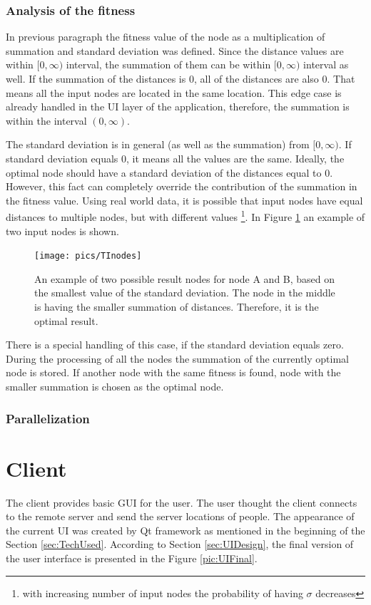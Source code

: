 \documentclass[thesis=M,english]{FITthesis}[2012/10/20]
\begin{document}
\subsubsection{Analysis of the fitness}
In previous paragraph the fitness value of the node as a multiplication of summation and standard deviation was defined. Since the distance values are within $[0, \infty)$ interval, the summation of them can be within $[0, \infty)$ interval as well. If the summation of the distances is $0$, all of the distances are also $0$. That means all the input nodes are located in the same location. This edge case is already handled in the UI layer of the application, therefore, the summation is within the interval $(0, \infty)$.

The standard deviation is in general (as well as the summation) from $[0, \infty)$. If standard deviation equals $0$, it means all the values are the same. Ideally, the optimal node should have a standard deviation of the distances equal to $0$. However, this fact can completely override the contribution of the summation in the fitness value. Using real world data, it is possible that input nodes have equal distances to multiple nodes, but with different values \footnote{with increasing number of input nodes the probability of having $\sigma$ decreases}. In Figure \ref{fig:TInodes} an example of two input nodes is shown.



\begin{figure}[H]
\centering
\texttt{[image: pics/TInodes]}
\caption{An example of two possible result nodes for node A and B, based on the smallest value of the standard deviation. The node in the middle is having the smaller summation of distances. Therefore, it is the optimal result.}
\label{fig:TInodes}
\end{figure}


There is a special handling of this case, if the standard deviation equals zero. During the processing of all the nodes the summation of the currently optimal node is stored. If another node with the same fitness is found, node with the smaller summation is chosen as the optimal node. 


\subsubsection{Parallelization}
\label{sec:real_parallelization}

\section{Client}
\label{sec:RClient}
The client provides basic GUI for the user. The user thought the client connects to the remote server and send the server locations of people.
The appearance of the current UI was created by Qt framework as mentioned in the beginning of the Section \ref{sec:TechUsed}. According to Section \ref{sec:UIDesign}, the final version of the user interface is presented in the Figure \ref{pic:UIFinal}.
\end{document}
